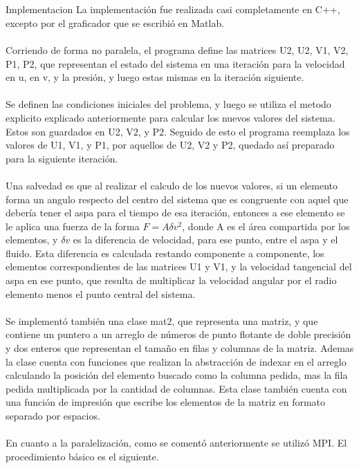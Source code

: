 
~\\
~\\

\begin{section}{Implementacion}
La implementación fue realizada casi completamente en C++, excepto por el graficador que se escribió en Matlab. 
~\\
~\\
Corriendo de forma no paralela, el programa define las matrices U2, U2, V1, V2, P1, P2, que representan el estado del sistema en una iteración para la velocidad en u, en v, y la presión, y luego estas mismas en la iteración siguiente. 
~\\
~\\
Se definen las condiciones iniciales del problema, y luego se utiliza el metodo explicito explicado anteriormente para calcular los nuevos valores del sistema. Estos son guardados en U2, V2, y P2. Seguido de esto el programa reemplaza los valores de U1, V1, y P1, por aquellos de U2, V2 y P2, quedado así preparado para la siguiente iteración. 
~\\
~\\
Una salvedad es que al realizar el calculo de los nuevos valores, si un elemento forma un angulo respecto del centro del sistema que es congruente con aquel que debería tener el aspa para el tiempo de esa iteración, entonces a ese elemento se le aplica una fuerza de la forma $F = A \delta v^2$, donde A es el área compartida por los elementos, y $\delta v$ es la diferencia de velocidad, para ese punto, entre el aspa y el fluido. Esta diferencia es calculada restando componente a componente, los elementos correspondientes de las matrices U1 y V1, y la velocidad tangencial del aspa en ese punto, que resulta de multiplicar la velocidad angular por el radio elemento menos el punto central del sistema. 
~\\
~\\
Se implementó también una clase mat2, que representa una matriz, y que contiene un puntero a un arreglo de números de punto flotante de doble precisión y dos enteros que representan el tamaño en filas y columnas de la matriz. Ademas la clase cuenta con funciones que realizan la abstracción de indexar en el arreglo calculando la posición del elemento buscado como la columna pedida, mas la fila pedida multiplicada por la cantidad de columnas. Esta clase también cuenta con una función de impresión que escribe los elementos de la matriz en formato separado por espacios.
~\\
~\\
En cuanto a la paralelización, como se comentó anteriormente se utilizó MPI. El procedimiento básico es el siguiente.
\begin{itemize}


\end{itemize}
\end{section}
